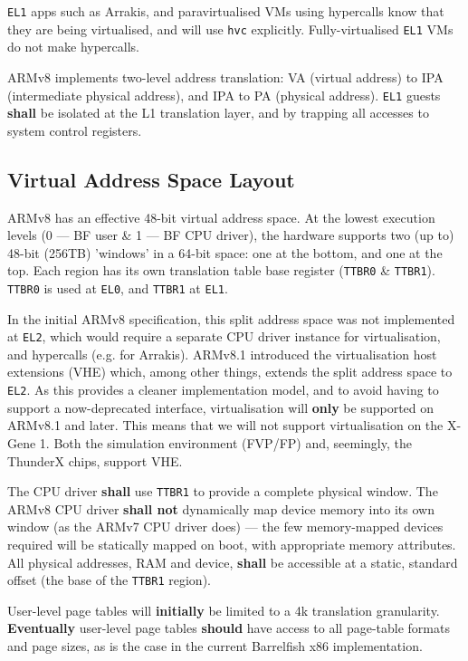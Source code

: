 \documentclass[a4paper,twoside]{report}
\begin{document}
\texttt{EL1} apps such as Arrakis, and paravirtualised VMs using hypercalls
know that they are being virtualised, and will use \texttt{hvc} explicitly.
Fully-virtualised \texttt{EL1} VMs do not make hypercalls.

ARMv8 implements two-level address translation: VA (virtual address) to IPA
(intermediate physical address), and IPA to PA (physical address).
\texttt{EL1} guests \textbf{shall} be isolated at the L1 translation layer,
and by trapping all accesses to system control registers.

\subsection{Virtual Address Space Layout}\label{s:layout}

ARMv8 has an effective 48-bit virtual address space. At the lowest execution
levels (0 --- BF user \& 1 --- BF CPU driver), the hardware supports two (up to)
48-bit (256TB) 'windows' in a 64-bit space: one at the bottom, and one at the
top.  Each region has its own translation table base register (\texttt{TTBR0}
\& \texttt{TTBR1}). \texttt{TTBR0} is used at \texttt{EL0}, and \texttt{TTBR1}
at \texttt{EL1}.

In the initial ARMv8 specification, this split address space was not
implemented at \texttt{EL2}, which would require a separate CPU driver
instance for virtualisation, and hypercalls (e.g. for Arrakis). ARMv8.1
introduced the virtualisation host extensions (VHE) which, among other things,
extends the split address space to \texttt{EL2}. As this provides a cleaner
implementation model, and to avoid having to support a now-deprecated
interface, virtualisation will \textbf{only} be supported on ARMv8.1 and
later. This means that we will not support virtualisation on the X-Gene 1.
Both the simulation environment (FVP/FP) and, seemingly, the ThunderX chips,
support VHE.

The CPU driver \textbf{shall} use \texttt{TTBR1} to provide a complete
physical window. The ARMv8 CPU driver \textbf{shall not} dynamically map
device memory into its own window (as the ARMv7 CPU driver does) --- the few
memory-mapped devices required will be statically mapped on boot, with
appropriate memory attributes. All physical addresses, RAM and device,
\textbf{shall} be accessible at a static, standard offset (the base of the
\texttt{TTBR1} region).

User-level page tables will \textbf{initially} be limited to a 4k translation
granularity.  \textbf{Eventually} user-level page tables \textbf{should} have
access to all page-table formats and page sizes, as is the case in the current
Barrelfish x86 implementation.
\end{document}
